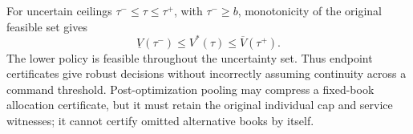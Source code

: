 For uncertain ceilings $\tau^-\leq\tau\leq\tau^+$, with $\tau^-\geq b$, monotonicity of the original feasible set gives
\begin{equation}\label{eq:robustbracket52}
 \underline V(\tau^-)\leq V^*(\tau)\leq\overline V(\tau^+).
\end{equation}
The lower policy is feasible throughout the uncertainty set. Thus endpoint certificates give robust decisions without incorrectly assuming continuity across a command threshold. Post-optimization pooling may compress a fixed-book allocation certificate, but it must retain the original individual cap and service witnesses; it cannot certify omitted alternative books by itself.
